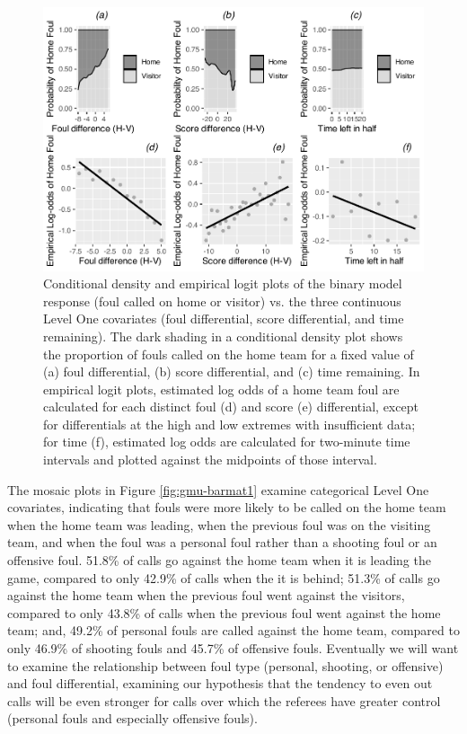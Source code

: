\documentclass[
]{krantz}
\begin{document}
\begin{figure}

{\centering \includegraphics[width=0.6\linewidth]{bookdown-BeyondMLR_files/figure-latex/gmu-cdelogitmat1-1} 

}

\caption{Conditional density and empirical logit plots of the binary model response (foul called on home or visitor) vs. the three continuous Level One covariates (foul differential, score differential, and time remaining).  The dark shading in a conditional density plot shows the proportion of fouls called on the home team for a fixed value of (a) foul differential, (b) score differential, and (c) time remaining.  In empirical logit plots, estimated log odds of a home team foul are calculated for each distinct foul (d) and score (e) differential, except for differentials at the high and low extremes with insufficient data; for time (f), estimated log odds are calculated for two-minute time intervals and plotted against the midpoints of those interval.}\label{fig:gmu-cdelogitmat1}
\end{figure}

The mosaic plots in Figure \ref{fig:gmu-barmat1} examine categorical Level One covariates, indicating that fouls were more likely to be called on the home team when the home team was leading, when the previous foul was on the visiting team, and when the foul was a personal foul rather than a shooting foul or an offensive foul. 51.8\% of calls go against the home team when it is leading the game, compared to only 42.9\% of calls when the it is behind; 51.3\% of calls go against the home team when the previous foul went against the visitors, compared to only 43.8\% of calls when the previous foul went against the home team; and, 49.2\% of personal fouls are called against the home team, compared to only 46.9\% of shooting fouls and 45.7\% of offensive fouls. Eventually we will want to examine the relationship between foul type (personal, shooting, or offensive) and foul differential, examining our hypothesis that the tendency to even out calls will be even stronger for calls over which the referees have greater control (personal fouls and especially offensive fouls).
\end{document}
